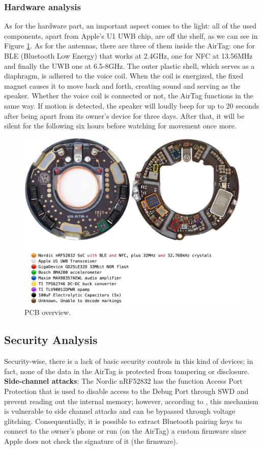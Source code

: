 \documentclass[english]{article}
\begin{document}
\subsubsection{Hardware analysis}\label{hw}
As for the hardware part, an important aspect comes to the light: all of the used components, apart from Apple's U1 UWB chip, are off the shelf, as we can see in Figure \ref{img:pcb}.
As for the antennas, there are three of them inside the AirTag: one for BLE (Bluetooth Low Energy) that works at 2.4GHz, one for NFC at 13.56MHz and finally the UWB one at 6.5-8GHz.
The outer plastic shell, which serves as a diaphragm, is adhered to the voice coil. When the coil is energized, the fixed magnet causes it to move back and forth, creating sound and serving as the speaker.
Whether the voice coil is connected or not, the AirTag functions in the same way.
If motion is detected, the speaker will loudly beep for up to 20 seconds after being apart from its owner's device for three days. After that, it will be silent for the following six hours before watching for movement once more.
\begin{figure}[ht]
	\centering
	\includegraphics[width=\textwidth]{images/pcb.png}
	\caption{PCB overview.}
	\label{img:pcb}
\end{figure}

\subsection{Security Analysis}\label{sec}
Security-wise, there is a lack of basic security controls in this kind of devices; in fact, none of the data in the AirTag is protected from tampering or disclosure.
\textbf{Side-channel attacks}:
The Nordic nRF52832 has the function Access Port Protection\cite{nordicsemi} that is used to disable access to the Debug Port through SWD and prevent reading out the internal memory; however, according to \cite{side}, this mechanism is vulnerable to side channel attacks and can be bypassed through voltage glitching. Consequentially, it is possible to extract Bluetooth pairing keys to connect to the owner’s phone or run (on the AirTag) a custom firmware since Apple does not check the signature of it (the firmware).
\end{document}
